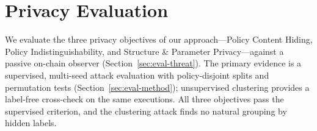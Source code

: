 \section{Privacy Evaluation}
\label{sec:eval}

We evaluate the three privacy objectives of our approach---Policy Content Hiding, Policy Indistinguishability, and Structure \& Parameter Privacy---against a passive on-chain observer (Section~\ref{sec:eval-threat}).
The primary evidence is a supervised, multi-seed attack evaluation with policy-disjoint splits and permutation tests (Section~\ref{sec:eval-method}); unsupervised clustering provides a label-free cross-check on the same executions.
All three objectives pass the supervised criterion, and the clustering attack finds no natural grouping by hidden labels.

















